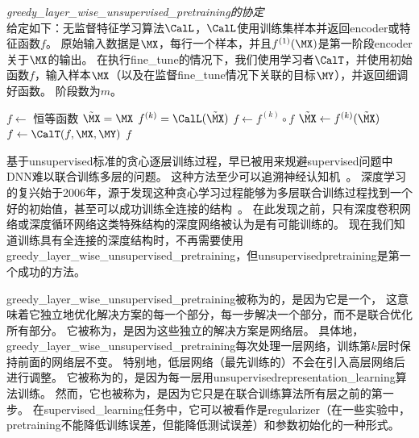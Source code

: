 \begin{algorithm}
\caption{ {\em \gls{greedy_layer_wise_unsupervised_pretraining}的协定}\\
给定如下：无监督特征学习算法$\CalL$，$\CalL$使用训练集样本并返回\gls{encoder}或特征函数$f$。
原始输入数据是$\MX$，每行一个样本，并且$f^{(1)}(\MX)$是第一阶段\gls{encoder}关于$\MX$的输出。
在执行\gls{fine_tune}的情况下，我们使用学习者$\CalT$，并使用初始函数$f$，输入样本$\MX$（以及在监督\gls{fine_tune}情况下关联的目标$\MY$），并返回细调好函数。 阶段数为$m$。
}
\label{alg:pretraining}
\begin{algorithmic}
\STATE $f \leftarrow$ 恒等函数
\STATE $\tilde{\MX} = \MX$
  \STATE $f^{(k)} = {\CalL}(\tilde{\MX})$
  \STATE $f \leftarrow f^{(k)} \circ f$
  \STATE $\tilde{\MX} \leftarrow f^{(k)}(\tilde{\MX})$
\ENDFOR
{}
  \STATE $f \leftarrow {\CalT}(f,\MX,\MY)$
\ENDIF
{} $f$
\end{algorithmic}
\end{algorithm}


基于\gls{unsupervised}标准的贪心逐层训练过程，早已被用来规避\gls{supervised}问题中\gls{DNN}难以联合训练多层的问题。
这种方法至少可以追溯神经认知机~\citep{Fukushima75}。
深度学习的复兴始于2006年，源于发现这种贪心学习过程能够为多层联合训练过程找到一个好的初始值，甚至可以成功训练全连接的结构~\citep{Hinton06-small,Hinton-Science2006,HintonG2006,Bengio-NIPS2007,ranzato-07-small}。
在此发现之前，只有深度卷积网络或深度循环网络这类特殊结构的深度网络被认为是有可能训练的。
现在我们知道训练具有全连接的深度结构时，不再需要使用\gls{greedy_layer_wise_unsupervised_pretraining}，但\gls{unsupervised}\gls{pretraining}是第一个成功的方法。


\gls{greedy_layer_wise_unsupervised_pretraining}被称为的，是因为它是一个，
这意味着它独立地优化解决方案的每一个部分，每一步解决一个部分，而不是联合优化所有部分。
它被称为，是因为这些独立的解决方案是网络层。
具体地，\gls{greedy_layer_wise_unsupervised_pretraining}每次处理一层网络，训练第$k$层时保持前面的网络层不变。
特别地，低层网络（最先训练的）不会在引入高层网络后进行调整。
它被称为的，是因为每一层用\gls{unsupervised}\gls{representation_learning}算法训练。
然而，它也被称为，是因为它只是在联合训练算法所有层之前的第一步。
在\gls{supervised_learning}任务中，它可以被看作是\gls{regularizer}（在一些实验中，\gls{pretraining}不能降低训练误差，但能降低测试误差）和参数初始化的一种形式。

